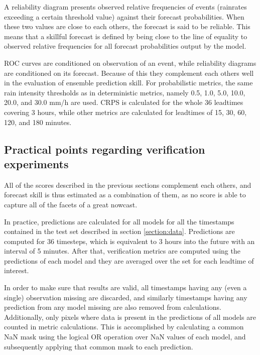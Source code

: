 A reliability diagram presents observed relative frequencies of events (rainrates exceeding a certain threshold value) against their forecast probabilities. When these two values are close to each others, the forecast is said to be reliable. This means that a skillful forecast is defined by being close to the line of equality to observed relative frequencies for all forecast probabilities output by the model. 

ROC curves are conditioned on observation of an event, while reliability diagrams are conditioned on its forecast. Because of this they complement each others well in the evaluation of ensemble prediction skill. For probabilistic metrics, the same rain intensity thresholds as in deterministic metrics, namely 0.5, 1.0, 5.0, 10.0, 20.0, and 30.0 mm/h are used. CRPS is calculated for the whole 36 leadtimes covering 3 hours, while other metrics are calculated for leadtimes of 15, 30, 60, 120, and 180 minutes. 


\subsection{Practical points regarding verification experiments}

 All of the scores described in the previous sections complement each others, and forecast skill is thus estimated as a combination of them, as no score is able to capture all of the facets of a great nowcast. 
 
 In practice, predictions are calculated for all models for all the timestamps contained in the test set described in section \ref{section:data}. Predictions are computed for 36 timesteps, which is equivalent to 3 hours into the future with an interval of 5 minutes. After that, verification metrics are computed using the predictions of each model and they are averaged over the set for each leadtime of interest. 
 
 In order to make sure that results are valid, all timestamps having any (even a single) observation missing are discarded, and similarly timestamps having any prediction from any model missing are also removed from calculations. Additionally, only pixels where data is present in the predictions of all models are counted in metric calculations. This is accomplished by calculating a common NaN mask using the logical OR operation over NaN values of each model, and subsequently applying that common mask to each prediction.
 
